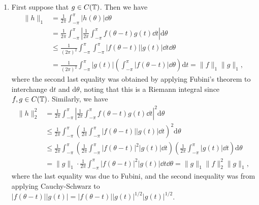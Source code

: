 \begin{pf}
\begin{enumerate}[(1)]
        \item First suppose that $g \in C(\mathbb{T})$. Then we have 
        \begin{align*}
            \|h\|_1 &= \frac{1}{2\pi} \int_{-\pi}^\pi |h(\theta)|\dd \theta \\ 
            &= \frac{1}{2\pi} \int_{-\pi}^\pi \left| \frac{1}{2\pi} \int_{-\pi}^\pi f(\theta - t) g(t)\dd t \right|\textrm{d}\theta \\ 
            &\leq \frac{1}{(2\pi)^2} \int_{-\pi}^\pi \int_{-\pi}^\pi |f(\theta - t)| |g(t)|\dd t \dd\theta \\ 
            &= \frac{1}{(2\pi)^2} \int_{-\pi}^\pi |g(t)| \left( \int_{-\pi}^\pi |f(\theta - t)|\dd\theta \right)\textrm{d}t
            = \|f\|_1 \|g\|_1,
        \end{align*}
        where the second last equality was obtained by applying Fubini's theorem
        to interchange $\textrm{d}t$ and $\textrm{d}\theta$, 
        noting that this is a Riemann integral since $f, g \in C(\mathbb{T})$. 
        Similarly, we have 
        \begin{align*}
            \|h\|_2^2 
            &= \frac{1}{2\pi} \int_{-\pi}^\pi \left| \frac{1}{2\pi} \int_{-\pi}^\pi f(\theta - t) g(t)\dd t \right|^2 \textrm{d}\theta \\ 
            &\leq \frac{1}{2\pi} \int_{-\pi}^\pi \left( \frac{1}{2\pi} \int_{-\pi}^\pi |f(\theta - t)| |g(t)|\dd t \right)^{\!2} \textrm{d}\theta \\ 
            &\leq \frac{1}{2\pi} \int_{-\pi}^\pi \left( \frac{1}{2\pi} \int_{-\pi}^\pi |f(\theta - t)|^2 |g(t)|\dd t \right) \left( \frac{1}{2\pi} \int_{-\pi}^\pi |g(t)|\dd t \right)\textrm{d}\theta \\ 
            &= \|g\|_1 \cdot \frac{1}{2\pi} \int_{-\pi}^\pi |f(\theta - t)|^2 |g(t)|\dd t \dd \theta = \|g\|_1 \|f\|_2^2 \|g\|_1, 
        \end{align*}
        where the last equality was due to Fubini, and the second inequality 
        was from applying Cauchy-Schwarz to $|f(\theta - t)||g(t)| 
        = |f(\theta - t)||g(t)|^{1/2} |g(t)|^{1/2}$. 


\end{enumerate}
\end{pf}
